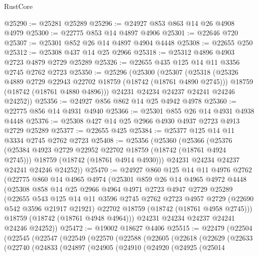 \begin{lexlean}{RustCore}
\begin{coremodule}
@25290 := @25281 @25289
@25296 := @24927 @853 @863 @14 @26 @4908 @4979
@25300 := @22775 @853 @14 @4897 @4906
@25301 := @22646 @720
@25307 := @25301 @852 @26 @14 @4897 @4904 @4448
@25308 := @22655 @250
@25312 := @25308 @437 @14 @25 @2966
@25318 := @25312 @4896 @4903 @2723 @4879 @2729 @25289
@25326 := @22655 @435 @125 @14 @11 @3356 @2745 @2762 @2723
@25350 := @25296
    (@25300
      (@25307
        (@25318
          (@25326 @4889 @2729 @22943 @22702 @18759 (@18742 (@18761 @4890 @2745)))
          @18759
          (@18742 (@18761 @4880 @4896)))
        @24231
        @24234
        @24237
        @24241
        @24246
        @24252))
@25356 := @24927 @856 @862 @14 @25 @4942 @4978
@25360 := @22775 @856 @14 @4931 @4940
@25366 := @25301 @855 @26 @14 @4931 @4938 @4448
@25376 := @25308 @427 @14 @25 @2966 @4930 @4937 @2723 @4913 @2729 @25289
@25377 := @22655 @425
@25384 := @25377 @125 @14 @11 @3334 @2745 @2762 @2723
@25408 := @25356
    (@25360
      (@25366
        (@25376
          (@25384 @4923 @2729 @22952 @22702 @18759 (@18742 (@18761 @4924 @2745)))
          @18759
          (@18742 (@18761 @4914 @4930)))
        @24231
        @24234
        @24237
        @24241
        @24246
        @24252))
@25470 := @24927
    @860
    @125
    @14
    @11
    @4976
    @2762
    (@22775
      @860
      @14
      @4965
      @4974
      (@25301
        @859
        @26
        @14
        @4965
        @4972
        @4448
        (@25308
          @858
          @14
          @25
          @2966
          @4964
          @4971
          @2723
          @4947
          @2729
          @25289
          (@22655
            @543
            @125
            @14
            @11
            @3596
            @2745
            @2762
            @2723
            @4957
            @2729
            (@22690 @542 @3596 @21917 @21921)
            @22702
            @18759
            (@18742 (@18761 @4958 @2745)))
          @18759
          (@18742 (@18761 @4948 @4964)))
        @24231
        @24234
        @24237
        @24241
        @24246
        @24252))
@25472 := @19002 @18627 @4406
@25515 := @22479
    (@22504
      (@22545
        (@22547
          (@22549
            (@22570
              (@22588
                (@22605
                  (@22618
                    (@22629
                      (@22633
                        (@22740
                          (@24833
                            (@24897
                              (@24905
                                (@24910
                                  (@24920
                                    (@24925
                                      (@25014

\end{coremodule}
\end{lexlean}
